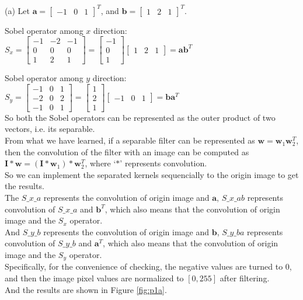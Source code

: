 (a) Let $\mathbf{a}=\begin{bmatrix}-1 & 0 & 1\end{bmatrix}^T$, and $\mathbf{b}=\begin{bmatrix}1 & 2 & 1\end{bmatrix}^T$.

Sobel operator among $x$ direction:
$S_x=\begin{bmatrix}
    -1 & -2 & -1 \\
    0 & 0 & 0 \\
    1 & 2 & 1
\end{bmatrix}=\begin{bmatrix}-1 \\ 0 \\ 1\end{bmatrix}\begin{bmatrix}1 & 2 & 1\end{bmatrix}= \mathbf{a}\mathbf{b}^T$

Sobel operator among $y$ direction:
$S_y=\begin{bmatrix}
    -1 & 0 & 1 \\
    -2 & 0 & 2 \\
    -1 & 0 & 1
\end{bmatrix}=\begin{bmatrix}1 \\ 2 \\ 1\end{bmatrix}\begin{bmatrix}-1 & 0 & 1\end{bmatrix}= \mathbf{b}\mathbf{a}^T$\\
So both the Sobel operators can be represented as the outer product of two vectors, i.e. its separable.\\
From what we have learned, if a separable filter can be represented as $\mathbf{w}= \mathbf{w}_1\mathbf{w}_2^T$, then the convolution of the filter with an image can be computed as $\mathbf{I}*\mathbf{w}=(\mathbf{I}*\mathbf{w}_1)*\mathbf{w}_2^T$, where `$*$' represents convolution.\\
So we can implement the separated kernels sequencially to the origin image to get the results.\\
The $S\_x\_a$ represents the convolution of origin image and $\mathbf{a}$, $S\_x\_ab$ represents convolution of $S\_x\_a$ and $\mathbf{b}^T$, which also means that the convolution of origin image and the $S_x$ operator.\\
And $S\_y\_b$ represents the convolution of origin image and $\mathbf{b}$, $S\_y\_ba$ represents convolution of $S\_y\_b$ and $\mathbf{a}^T$, which also means that the convolution of origin image and the $S_y$ operator.\\
Specifically, for the convenience of checking, the negative values are turned to $0$, and then the image pixel values are normalized to $[0, 255]$ after filtering.\\
And the results are shown in Figure \ref{fig:p1a}.\\

